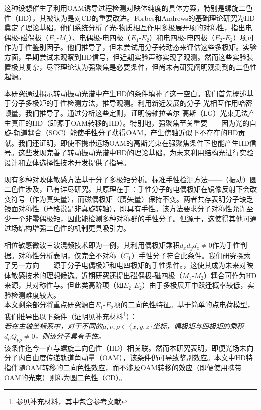 \documentclass[reprint,aps,prl,twocolumn,superscriptaddress,groupedaddress]{revtex4-2}
\newcommand{\eomo}{$E_1$-$M_1$}
\newcommand{\eoet}{$E_1$-$E_2$}
\newcommand{\etet}{$E_2$-$E_2$}
\begin{document}
\begin{CJK*}{UTF8}{gbsn}
这种设想催生了利用OAM诱导过程检测对映体纯度的具体方案，特别是螺旋二色性（HD）\cite{ANDREWS2004,Ye2019,Li2021}，其被认为是对CD的重要改进\cite{Ye2019,Li2021}。Forbes和Andrews的基础理论研究\cite{Forbes2018,Forbes2019,Forbes2021}为HD奠定了理论基础，他们系统分析了光-物质相互作用多极展开项的对称性，指出电偶极-磁偶极（\eomo）、电偶极-电四极（\eoet）和电四极-电四极（\etet）项可作为手性鉴别因子。他们推导了，但未尝试用分子转动态来评估这些多极矩。实验方面，早期尝试未观察到HD信号\cite{Araoka2005,Loeffler2011}，但近期实验声称实现了观测\cite{Rusak2019,Zhang2020,Rouxel2022,Begin2023,Jain2023}。然而这些实验装置极其复杂，尽管理论认为强聚焦是必要条件\cite{Forbes2019}，但尚未有研究阐明观测到的二色性起源。

本研究通过揭示转动振动光谱中产生HD的条件填补了这一空白。我们首先概述基于分子多极矩的手性检测方法，推导观测。利用新近发展的分子-光相互作用哈密顿量\cite{Maslov2024,Maslov_Thesis}，我们推导了。通过分析这些定则，证明傍轴拉盖尔-高斯（LG）光束无法产生真正的HD（即源于OAM转移的HD）。特别地，强聚焦至关重要——因为光的自旋-轨道耦合（SOC）\cite{Bliokh2015}能使手性分子获得OAM，产生傍轴近似下不存在的HD贡献。我们还证明，即使不携带远场OAM的高斯光束在强聚焦条件下也能产生HD信号。这些发现完善了转动振动光谱中HD的理论基础，为未来利用结构光进行实验设计和立体选择性技术开发提供了指导。

现有多种对映体敏感方法基于分子多极矩分析。标准手性检测方法——（振动）圆二色性涉及，已有详尽研究\cite{Stephens1985,BUCKINGHAM1987,Mun2019,Lovesey2019}。其原理在于：手性分子的电偶极矩在镜像反射下会改变符号（作为真矢量），而磁偶极矩（赝矢量）保持不变。两者共存表明分子缺乏镜面对称性（严格说是非真旋转轴），即具有手性。该方法要求分子对称性允许至少一个非零偶极矩，因此能检测多种对称群的手性分子。但源于，这使得其他可通过场结构增强二色性的机制更具吸引力。

相位敏感微波三波混频技术\cite{Patterson2013,Patterson2013PRL}即为一例，其利用偶极矩乘积$d_xd_yd_z\neq 0$作为手性判据\cite{Patterson2013,Ordonez2018,Ayuso2022}。对称性分析表明，仅完全不对称（$C_1$）手性分子符合此条件。我们研究探索了另一方向——源于分子电偶极矩和电四极矩的手性条件。，这使其成为未来对映体敏感技术的理想候选。近期研究还提出磁偶极-磁四极（$M_1$-$M_2$）耦合可作为HD来源，其对称性与\cite{Ji2024}。但此类高阶项（如\etet）由于多极展开中跃迁概率较低，实验检测难度较大。\\
本文剩余部分将重点研究源自\eoet 项的二向色性特征。基于简单的点电荷模型，我们推导出以下条件（证明见补充材料\footnote{参见补充材料，其中包含参考文献\cite{Maslov2024,Maslov_Thesis,Lax1975,Bliokh2015,Bliokh2023}}）：\\
\textit{若在主轴坐标系中，对于不同的$\mu, \nu, \rho \in \{x,y,z\}$坐标，偶极矩与四极矩的乘积$d_{\mu}Q_{\nu \rho} \neq 0$，则该分子具有手性。}\\
该条件迄今一直与螺旋二向色性（HD）相关联\cite{ANDREWS2004,Forbes2018}。然而本研究表明，即便光场未向分子内自由度传递轨道角动量（OAM），该条件仍可导致鉴别效应。本文中HD特指伴随OAM转移的二向色性效应，而不涉及OAM转移的效应（即便使用携带OAM的光束）则称为圆二色性（CD）。


\end{CJK*}
\end{document}
